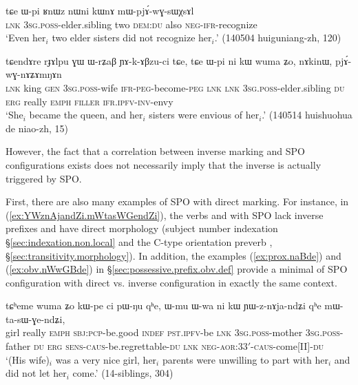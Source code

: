 \begin{exe}
\ex \label{ex:mWpjAwGsWXsAl}
 \gll  tɕe ɯ-pi ʁnɯz nɯni kɯnɤ mɯ-pjɤ́-wɣ-sɯχsɤl \\
 \textsc{lnk} \textsc{3sg}.\textsc{poss}-elder.sibling two \textsc{dem}:\textsc{du} also \textsc{neg}-\textsc{ifr}-recognize \\
 \glt `Even her$_i$ two elder sisters did not recognize her$_i$.' (140504 huiguniang-zh, 120)
\end{exe}
 
 \begin{exe}
\ex \label{ex:pjAwGnAZAmNAn}
 \gll tɕendɤre rɟɤlpu ɣɯ ɯ-rʑaβ ɲɤ-k-ɤβzu-ci tɕe, tɕe ɯ-pi ni kɯ wuma ʑo, nɤkinɯ, pjɤ́-wɣ-nɤʑɤmŋɤn \\
\textsc{lnk} king \textsc{gen} \textsc{3sg}.\textsc{poss}-wife \textsc{ifr}-\textsc{peg}-become-\textsc{peg} \textsc{lnk} \textsc{lnk} \textsc{3sg}.\textsc{poss}-elder.sibling \textsc{du} \textsc{erg} really \textsc{emph} \textsc{filler} \textsc{ifr}.\textsc{ipfv}-\textsc{inv}-envy \\
\glt `She$_i$ became the queen, and her$_i$ sisters were envious of her$_i$.' (140514 huishuohua de niao-zh, 15)
\end{exe}

However, the fact that a correlation between inverse marking and SPO configurations exists does not necessarily imply that the inverse is actually triggered by SPO. 

First, there are also many examples of SPO with direct marking. For instance, in (\ref{ex:YWznAjandZi.mWtasWGendZi}), the verbs  and  with SPO lack inverse prefixes and have direct morphology (subject number indexation §\ref{sec:indexation.non.local} and the C-type orientation preverb , §\ref{sec:transitivity.morphology}). In addition, the examples (\ref{ex:prox.naBde}) and (\ref{ex:obv.nWwGBde}) in §\ref{sec:possessive.prefix.obv.def} provide a minimal of SPO configuration with direct vs. inverse configuration in exactly the same context.

  \begin{exe}
\ex \label{ex:YWznAjandZi.mWtasWGendZi}
 \gll  tɕʰeme wuma ʑo kɯ-pe ci pɯ-ŋu qʰe, ɯ-mu ɯ-wa ni kɯ ɲɯ-z-nɤja-ndʑi qʰe mɯ-ta-sɯ-ɣe-ndʑi, \\
 girl really \textsc{emph} \textsc{sbj}:\textsc{pcp}-be.good \textsc{indef} \textsc{pst}.\textsc{ipfv}-be \textsc{lnk} \textsc{3sg}.\textsc{poss}-mother \textsc{3sg}.\textsc{poss}-father \textsc{du} \textsc{erg} \textsc{sens}-\textsc{caus}-be.regrettable-\textsc{du} \textsc{lnk} \textsc{neg}-\textsc{aor}:3\fl{}3$'$-\textsc{caus}-come[II]-\textsc{du} \\
 \glt `(His wife)$_i$  was a very nice girl, her$_i$ parents were unwilling to part with her$_i$ and did not let her$_i$ come.' (14-siblings, 304)
 \end{exe}
 
